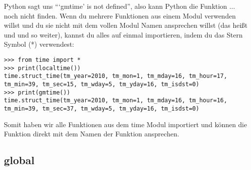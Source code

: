 Python sagt uns ```gmtime' is not defined'', also kann Python die Funktion \texorpdfstring{$\ldots$}{...} noch nicht finden. Wenn du mehrere Funktionen aus einem Modul verwenden willst und du sie nicht mit dem vollen Modul Namen ansprechen willst (das heißt  und  und so weiter), kannst du alles auf einmal importieren, indem du das Stern Symbol (*) verwendest:

\begin{Verbatim}[frame=single]
>>> from time import *
>>> print(localtime())
time.struct_time(tm_year=2010, tm_mon=1, tm_mday=16, tm_hour=17, 
tm_min=39, tm_sec=15, tm_wday=5, tm_yday=16, tm_isdst=0)
>>> print(gmtime())
time.struct_time(tm_year=2010, tm_mon=1, tm_mday=16, tm_hour=16, 
tm_min=39, tm_sec=37, tm_wday=5, tm_yday=16, tm_isdst=0)
\end{Verbatim}

Somit haben wir alle Funktionen aus dem time Modul importiert und können die Funktion direkt mit dem Namen der Funktion ansprechen.

\subsection*{global}

